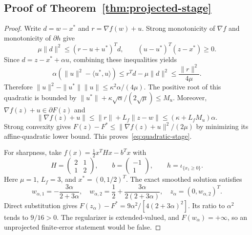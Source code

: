 \subsection{Proof of Theorem~\ref{thm:projected-stage}}\label{app:projected-stage}
\begin{proof}
Write $d=w-x^*$ and $r=\nabla f(w)+u$. Strong monotonicity of $\nabla f$ and monotonicity of $\partial h$ give
\[
\mu\|d\|^2\le(r-u+u^*)^Td,
\qquad (u-u^*)^T(z-x^*)\ge0.
\]
Since $d=z-x^*+\alpha u$, combining these inequalities yields
\[
\alpha(\|u\|^2-\langle u^*,u\rangle)
\le r^Td-\mu\|d\|^2\le\frac{\|r\|^2}{4\mu}.
\]
Therefore $\|u\|^2-\|u^*\|\|u\|\le\kappa^2\alpha/(4\mu)$. The positive root of this quadratic is bounded by
$\|u^*\|+\kappa\sqrt\alpha/(2\sqrt\mu)\le M_u$.
Moreover, $\nabla f(z)+u\in\partial F(z)$ and
\[
\|\nabla f(z)+u\|\le\|r\|+L_f\|z-w\|
\le(\kappa+L_fM_u)\alpha.
\]
Strong convexity gives $F(z)-F^*\le\|\nabla f(z)+u\|^2/(2\mu)$ by minimizing its affine-quadratic lower bound. This proves~\eqref{eq:quadratic-stage}.

For sharpness, take $f(x)=\tfrac12x^THx-b^Tx$ with
\[
H=\begin{pmatrix}2&1\\1&2\end{pmatrix},\qquad
b=\begin{pmatrix}-1\\1\end{pmatrix},\qquad
h=\iota_{\{x_1\ge0\}}.
\]
Here $\mu=1$, $L_f=3$, and $x^*=(0,1/2)^T$. The exact smoothed solution satisfies
\[
w_{\alpha,1}=-\frac{3\alpha}{2+3\alpha},\quad
w_{\alpha,2}=\frac12+\frac{3\alpha}{2(2+3\alpha)},\quad
z_\alpha=(0,w_{\alpha,2})^T.
\]
Direct substitution gives
$F(z_\alpha)-F^*=9\alpha^2/[4(2+3\alpha)^2]$.
Its ratio to $\alpha^2$ tends to $9/16>0$. The regularizer is extended-valued, and $F(w_\alpha)=+\infty$, so an unprojected finite-error statement would be false.
\end{proof}

